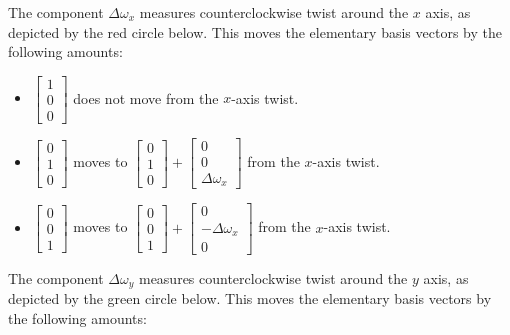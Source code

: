 \documentclass{article}
\begin{document}
The component \(\Delta\omega_x\) measures counterclockwise twist around the \(x\) axis, as depicted by the red circle below. This moves the elementary basis vectors by the following amounts:
\begin{itemize}
\item \(\begin{bmatrix} 1 \\ 0 \\ 0 \end{bmatrix}\) does not move from the \(x\)-axis twist.
\item \(\begin{bmatrix} 0 \\ 1 \\ 0 \end{bmatrix}\) moves to \(\begin{bmatrix} 0 \\ 1 \\ 0 \end{bmatrix} + \begin{bmatrix} 0 \\ 0 \\ \Delta\omega_x \end{bmatrix}\) from the \(x\)-axis twist.
\item \(\begin{bmatrix} 0 \\ 0 \\ 1 \end{bmatrix}\) moves to \(\begin{bmatrix} 0 \\ 0 \\ 1 \end{bmatrix} + \begin{bmatrix} 0 \\ -\Delta\omega_x \\ 0 \end{bmatrix}\) from the \(x\)-axis twist.
\end{itemize}   
The component \(\Delta\omega_y\) measures counterclockwise twist around the \(y\) axis, as depicted by the green circle below. This moves the elementary basis vectors by the following amounts:
\end{document}
